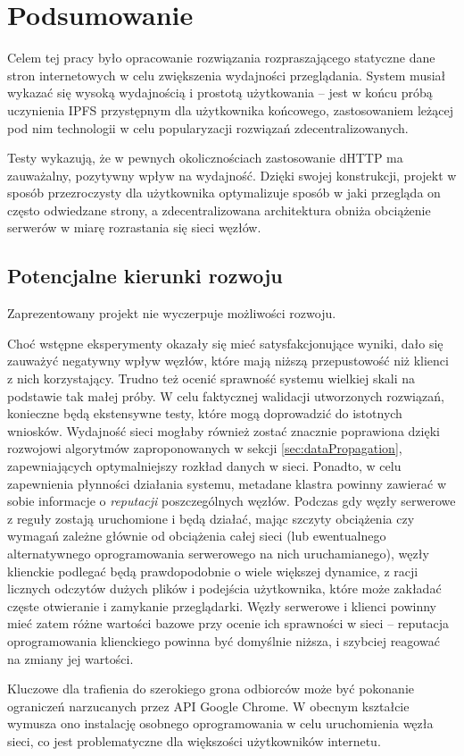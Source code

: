 \chapter{Podsumowanie}
\label{cha:summary}

Celem tej pracy było opracowanie rozwiązania rozpraszającego statyczne dane stron internetowych w celu zwiększenia wydajności przeglądania. System musiał wykazać się wysoką wydajnością i prostotą użytkowania -- jest w końcu próbą uczynienia IPFS przystępnym dla użytkownika końcowego, zastosowaniem leżącej pod nim technologii w celu popularyzacji rozwiązań zdecentralizowanych.

Testy wykazują, że w pewnych okolicznościach zastosowanie dHTTP ma zauważalny, pozytywny wpływ na wydajność. Dzięki swojej konstrukcji, projekt w sposób przezroczysty dla użytkownika optymalizuje sposób w jaki przegląda on często odwiedzane strony, a zdecentralizowana architektura obniża obciążenie serwerów w miarę rozrastania się sieci węzłów.

\section{Potencjalne kierunki rozwoju}
\label{sec:future}

Zaprezentowany projekt nie wyczerpuje możliwości rozwoju.

Choć wstępne eksperymenty okazały się mieć satysfakcjonujące wyniki, dało się zauważyć negatywny wpływ węzłów, które mają niższą przepustowość niż klienci z nich korzystający. Trudno też ocenić sprawność systemu wielkiej skali na podstawie tak małej próby. W celu faktycznej walidacji utworzonych rozwiązań, konieczne będą ekstensywne testy, które mogą doprowadzić do istotnych wniosków. Wydajność sieci mogłaby również zostać znacznie poprawiona dzięki rozwojowi algorytmów zaproponowanych w sekcji \ref{sec:dataPropagation}, zapewniających optymalniejszy rozkład danych w sieci. Ponadto, w celu zapewnienia płynności działania systemu, metadane klastra powinny zawierać w sobie informacje o {\em reputacji} poszczególnych węzłów. Podczas gdy węzły serwerowe z reguły zostają uruchomione i będą działać, mając szczyty obciążenia czy wymagań zależne głównie od obciążenia całej sieci (lub ewentualnego alternatywnego oprogramowania serwerowego na nich uruchamianego), węzły klienckie podlegać będą prawdopodobnie o wiele większej dynamice, z racji licznych odczytów dużych plików i podejścia użytkownika, które może zakładać częste otwieranie i zamykanie przeglądarki. Węzły serwerowe i klienci powinny mieć zatem różne wartości bazowe przy ocenie ich sprawności w sieci -- reputacja oprogramowania klienckiego powinna być domyślnie niższa, i szybciej reagować na zmiany jej wartości.

Kluczowe dla trafienia do szerokiego grona odbiorców może być pokonanie ograniczeń narzucanych przez API Google Chrome. W obecnym kształcie wymusza ono instalację osobnego oprogramowania w celu uruchomienia węzła sieci, co jest problematyczne dla większości użytkowników internetu.